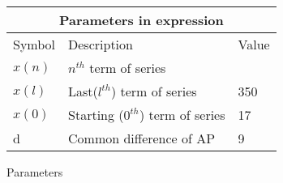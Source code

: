 \setlength{\arrayrulewidth}{0.3mm}
\setlength{\tabcolsep}{15pt}
\renewcommand{\arraystretch}{1.5}



\begin{tabular}{ |p{1cm}|p{3cm}|p{1cm}| }
\hline
\multicolumn{3}{|c|}{Parameters in expression}\\
\hline
Symbol & Description & Value\\
\hline
$x(n)$ & $n^{th}$ term of series & \\
\hline
$x(l)$ & Last($l^{th}$) term of series & 350\\
\hline
$x(0)$ & Starting ($0^{th}$) term of series & 17 \\
\hline
d & Common difference of AP & 9\\
\hline
\end{tabular}
\caption{Parameters}


